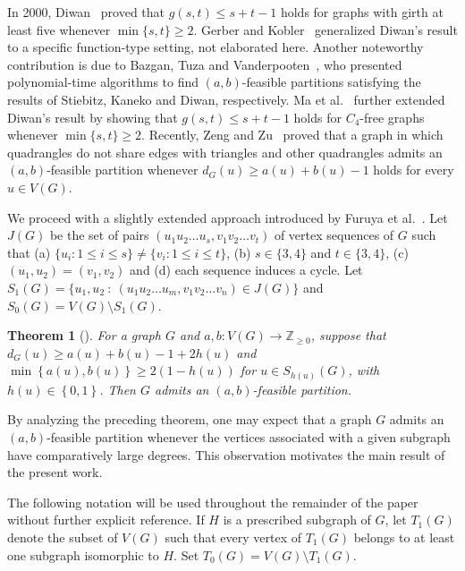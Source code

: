 \documentclass[11p]{elsarticle}
\newtheorem{thm}{Theorem}
\theoremstyle{definition}
\begin{document}
In 2000, Diwan~\cite{Diwan} proved that 
$
g(s,t) \le s + t - 1
$ 
holds for graphs with girth at least five whenever $\min\{s,t\} \ge 2$. Gerber and Kobler~\cite{Kobler} generalized Diwan's result to a specific function-type setting, not elaborated here. 
Another noteworthy contribution is due to Bazgan, Tuza and Vanderpooten~\cite{Vander}, who presented polynomial-time algorithms to find $(a,b)$-feasible partitions satisfying the results of Stiebitz, Kaneko and Diwan, respectively. Ma et al.~\cite{Ma} further extended Diwan's result by showing that 
$
g(s,t) \le s + t - 1
$ 
holds for $C_4$-free graphs whenever $\min\{s,t\} \ge 2$. 
Recently, Zeng and Zu~\cite{Zu} proved that a graph in which quadrangles do not share edges with triangles and other quadrangles admits an  $ (a,b) $-feasible partition whenever $ d_{G}(u)\geqslant a(u)+b(u)-1 $ holds for every  $ u\in V(G) $.

We proceed with a slightly extended  approach introduced by Furuya et al.~\cite{Fu}. Let $ J(G) $  be the set of pairs  $ (u_{1}u_{2}\ldots u_{s},v_{1}v_{2}\ldots v_{t}) $  of vertex sequences of $ G $  such that (a) $ \{u_{i}:1\leq i\leq s\}\neq\{v_{i}:1\leq i\leq t\} $, (b) $s\in\{3,4\} $  and  $t\in\{3,4\} $, (c) $ (u_{1},u_{2})=(v_{1},v_{2}) $ and (d) each sequence induces a  cycle. Let  $S_{1}(G)=\{u_{1},u_{2}~:~(u_{1}u_{2}\ldots u_{m},v_{1}v_{2}\ldots v_{n})\in J(G)\} $  and  $ S_{0}(G)=V(G)\setminus S_{1}(G) $.

\begin{thm}[\cite{Fu}]\label{thm:D}
		For a graph $ G $  and  $ a,b\colon V(G)\longrightarrow \mathbb{Z}_{\geq 0}$, suppose that $ d_G(u)\ge a(u)+b(u)-1+2h(u)$ and  $\min \left\lbrace a(u),b(u)\right\rbrace\ge 2(1-h(u))$ for $u\in S_{h(u)}(G)$, with $ h(u)\in \left\lbrace 0,1\right\rbrace  $. Then $G$ admits an $ (a,b) $-feasible partition.
\end{thm}

By analyzing the preceding theorem, one may expect that a graph $G$ admits an $(a,b)$-feasible partition 
whenever the vertices associated with a given subgraph have comparatively large degrees. 
This observation motivates the main result of the present work.


The following notation will be used throughout the remainder of the paper without further explicit reference.
 If $H$ is a prescribed subgraph of $G$,  let $T_1(G)$ denote the subset of $V(G)$ such that every vertex of $T_1(G)$ belongs to at least one subgraph isomorphic to $H$. Set $T_0(G) = V(G) \setminus T_1(G)$.
\end{document}
